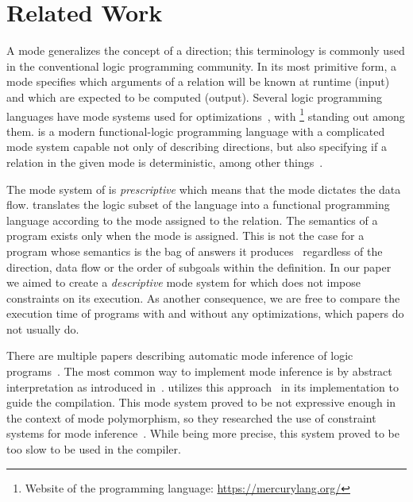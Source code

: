 \section{Related Work}
\label{sec:related}

A mode generalizes the concept of a direction; this terminology is commonly used in the conventional logic programming community.
In its most primitive form, a mode specifies which arguments of a relation will be known at runtime (input) and which are expected to be computed (output).
Several logic programming languages have mode systems used for optimizations~\cite{warren1977implementing, van1992high, thom1986nu}, with \merc\footnote{Website of the \merc programming language: \url{https://mercurylang.org/}} standing out among them.
\merc is a modern functional-logic programming language with a complicated mode system capable not only of describing directions, but also specifying if a relation in the given mode is deterministic, among other things~\cite{somogyi1987system,overton2002constraint}.

The mode system of \merc is \emph{prescriptive} which means that the mode dictates the data flow.
\merc translates the logic subset of the language into a functional programming language according to the mode assigned to the relation.
The semantics of a \merc program exists only when the mode is assigned.
This is not the case for a \mk program whose semantics is the bag of answers it produces~\cite{rozplokhas2020certified} regardless of the direction, data flow or the order of subgoals within the definition.
In our paper we aimed to create a \emph{descriptive} mode system for \mk which does not impose constraints on its execution.
As another consequence, we are free to compare the execution time of programs with and without any optimizations, which \merc papers do not usually do.

There are multiple papers describing automatic mode inference of logic programs~\cite{debray1988automatic, ridoux1999typed, smaus2000mode}.
The most common way to implement mode inference is by abstract interpretation as introduced in~\cite{janssens1992deriving}.
\merc utilizes this approach~\cite{somogyi1987system} in its implementation to guide the compilation.
This mode system proved to be not expressive enough in the context of mode polymorphism, so they researched the use of constraint systems for mode inference~\cite{overton2002constraint}.
While being more precise, this system proved to be too slow to be used in the compiler.

